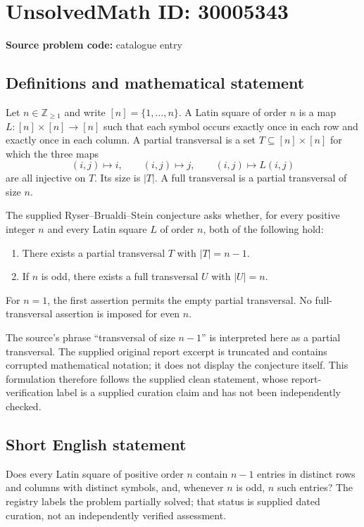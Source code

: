 \documentclass[11pt]{article}
\newcommand{\Z}{\mathbb{Z}}
\begin{document}
\section*{UnsolvedMath ID: 30005343}
\textbf{Source problem code:} catalogue entry
\subsection{Definitions and mathematical statement}
Let \(n\in\Z_{\geq 1}\) and write \([n]=\{1,\ldots,n\}\). A Latin square of order \(n\) is a map \(L:[n]\times[n]\to[n]\) such that each symbol occurs exactly once in each row and exactly once in each column. A partial transversal is a set \(T\subseteq[n]\times[n]\) for which the three maps
\[
(i,j)\longmapsto i,\qquad (i,j)\longmapsto j,\qquad (i,j)\longmapsto L(i,j)
\]
are all injective on \(T\). Its size is \(|T|\). A full transversal is a partial transversal of size \(n\).

The supplied Ryser--Brualdi--Stein conjecture asks whether, for every positive integer \(n\) and every Latin square \(L\) of order \(n\), both of the following hold:
\begin{enumerate}
\item There exists a partial transversal \(T\) with \(|T|=n-1\).
\item If \(n\) is odd, there exists a full transversal \(U\) with \(|U|=n\).
\end{enumerate}
For \(n=1\), the first assertion permits the empty partial transversal. No full-transversal assertion is imposed for even \(n\).

The source's phrase ``transversal of size \(n-1\)'' is interpreted here as a partial transversal. The supplied original report excerpt is truncated and contains corrupted mathematical notation; it does not display the conjecture itself. This formulation therefore follows the supplied clean statement, whose report-verification label is a supplied curation claim and has not been independently checked.
\subsection{Short English statement}
Does every Latin square of positive order \(n\) contain \(n-1\) entries in distinct rows and columns with distinct symbols, and, whenever \(n\) is odd, \(n\) such entries? The registry labels the problem partially solved; that status is supplied dated curation, not an independently verified assessment.
\end{document}
